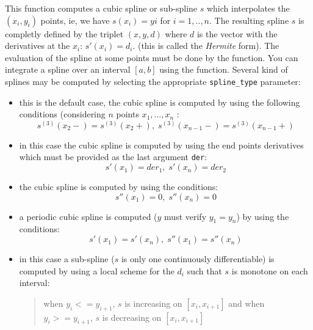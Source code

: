   \begin{mandescription}
    This function computes a cubic spline or sub-spline $s$ which interpolates the 
    $(x_i,y_i)$ points, ie, we have $s(x_i)=yi$ for $i=1,..,n$. 
    The resulting spline $s$ is completly defined by the triplet $(x,y,d)$ where
    $d$ is the vector with the derivatives at the $x_i$: $s'(x_i)=d_i$.
    (this is called the {\em Hermite} form). 
    The evaluation of the spline at some points must be done by the    function.
    You can integrate a spline over an interval $[a,b]$ using the  function. 
    Several kind of splines may be computed by selecting the appropriate \verb!spline_type!
    parameter: 
    
  \begin{itemize}

       \item {}  this is the default case, the cubic spline is computed by using the
             following conditions (considering $n$ points
             $x_1,...,x_n$ :
	     $$
    s^{(3)}(x_2-) = s^{(3)}(x_2+), \; s^{(3)}(x_{n-1}-) = s^{(3)}(x_{n-1}+)
         $$

       \item {} in this case the cubic spline is computed by using the end points
             derivatives which must be provided as the last argument \verb!der!:
    $$
    s'(x_1) = der_1, \; s'(x_n) = der_2
    $$     

       \item {} the cubic spline is computed by using the conditions:
    $$
    s''(x_1) = 0, \; s''(x_n) = 0
    $$     

       \item {} a periodic cubic spline is computed ($y$ must verify $y_1=y_n$)
              by using the conditions:
    $$
    s'(x_1) = s'(x_n), \;  s''(x_1) = s''(x_n)
    $$     

       \item {} in this case a sub-spline ($s$ is  only one continuously differentiable)
              is computed by using a local scheme for the $d_i$ such that
              $s$ is monotone on each interval:
    \begin{quote}
    when $y_i <= y_{i+1}$,  $s$ is increasing on $[x_i, x_{i+1}]$ \newline
    and when $y_i >= y_{i+1}$,  $s$ is decreasing on $[x_i, x_{i+1}]$ 
    \end{quote}


\end{itemize}
\end{mandescription}
